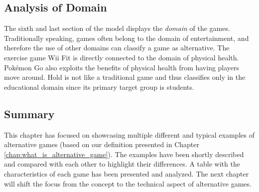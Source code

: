 \subsection{Analysis of Domain}
The sixth and last section of the model displays the \textit{domain} of the games. Traditionally speaking, games often belong to the domain of entertainment, and therefore the use of other domains can classify a game as alternative. The exercise game Wii Fit is directly connected to the domain of physical health. Pokémon Go also exploits the benefits of physical health from having players move around. Hold is not like a traditional game and thus classifies only in the educational domain since its primary target group is students.

\subsection{Summary}
This chapter has focused on showcasing multiple different and typical examples of alternative games (based on our definition presented in Chapter \ref{chap:what_is_alternative_game}). The examples have been shortly described and compared with each other to highlight their differences. A table with the characteristics of each game has been presented and analyzed. The next chapter will shift the focus from the concept to the technical aspect of alternative games.  
